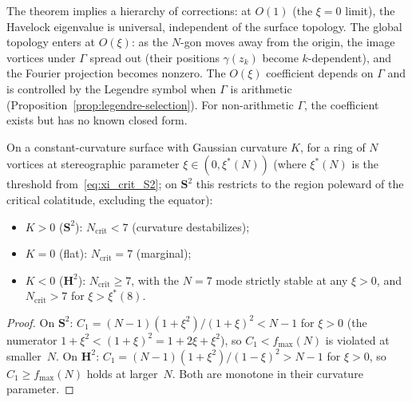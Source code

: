 \begin{remark}
\label{rmk:topology-correction}
The theorem implies a hierarchy of corrections:
at $O(1)$ (the $\xi = 0$ limit), the Havelock eigenvalue is
universal, independent of the surface topology.
The global topology enters at $O(\xi)$: as the $N$-gon moves
away from the origin, the image vortices under $\Gamma$ spread
out (their positions $\gamma(z_k)$ become $k$-dependent), and
the Fourier projection becomes nonzero.
The $O(\xi)$ coefficient depends on $\Gamma$ and is controlled
by the Legendre symbol when $\Gamma$ is arithmetic
(Proposition~\ref{prop:legendre-selection}).
For non-arithmetic $\Gamma$, the coefficient exists but has no
known closed form.
\end{remark}


\begin{proposition}
\label{prop:curvature-dichotomy}
On a constant-curvature surface with Gaussian curvature $K$,
for a ring of $N$ vortices at stereographic parameter
$\xi \in (0, \xi^*(N))$ (where $\xi^*(N)$ is the threshold
from~\eqref{eq:xi_crit_S2}; on $\mathbf{S}^2$ this restricts
to the region poleward of the critical colatitude, excluding the
equator):
\begin{itemize}
\item $K > 0$ ($\mathbf{S}^2$): $N_{\mathrm{crit}} < 7$
  (curvature destabilizes);
\item $K = 0$ (flat): $N_{\mathrm{crit}} = 7$ (marginal);
\item $K < 0$ ($\mathbf{H}^2$): $N_{\mathrm{crit}} \ge 7$,
  with the $N = 7$ mode strictly stable at any $\xi > 0$,
  and $N_{\mathrm{crit}} > 7$ for $\xi > \xi^*(8)$.
\end{itemize}
\end{proposition}

\begin{proof}
On $\mathbf{S}^2$: $C_1 = (N{-}1)(1{+}\xi^2)/(1{+}\xi)^2 < N{-}1$
for $\xi > 0$ (the numerator $1{+}\xi^2 < (1{+}\xi)^2 = 1{+}2\xi{+}\xi^2$),
so $C_1 < f_{\max}(N)$ is violated at smaller~$N$.
On $\mathbf{H}^2$: $C_1 = (N{-}1)(1{+}\xi^2)/(1{-}\xi)^2 > N{-}1$
for $\xi > 0$, so $C_1 \ge f_{\max}(N)$ holds at larger~$N$.
Both are monotone in their curvature parameter.
\end{proof}

